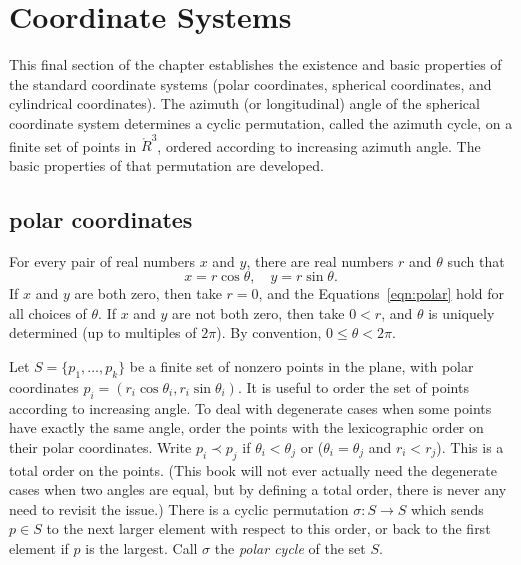 \section{Coordinate Systems}

This final section of the chapter establishes the existence
and basic properties of the standard coordinate systems
(polar coordinates, spherical coordinates, and cylindrical
coordinates).  The azimuth (or longitudinal) angle of the
spherical coordinate system determines a cyclic permutation,
called the azimuth cycle, on a finite set of points in $\ring{R}^3$, ordered according
to increasing azimuth angle.  The basic
properties of that permutation are developed. 
%
%
%
%
%
%

\subsection{polar coordinates}
\label{sec:polar}
%
%


For every pair of real numbers $x$ and $y$,  there are real numbers
$r$ and $\theta$ such that
    \begin{equation}\label{eqn:polar}
    x = r\cos\theta,\quad y = r\sin\theta.
    \end{equation}
If $x$ and $y$ are both zero, then take $r=0$, and the
Equations~\ref{eqn:polar} hold for all choices of $\theta$. If $x$
and $y$ are not both zero, then take $0<r$, and $\theta$ is
uniquely determined (up to multiples of $2\pi$).  By convention, 
$0\le\theta < 2\pi$.
%
%

Let $S=\{p_1,\ldots,p_k\}$ be a finite set of
nonzero points in the plane, with
polar coordinates $p_i = (r_i\cos\theta_i,r_i\sin\theta_i)$.
It is useful to order the set of points according to increasing angle.
To deal with degenerate cases when some points have exactly
the same angle, order the points with the lexicographic order on their
polar coordinates.  Write $p_i \prec p_j$ if
$\theta_i < \theta_j$ or ($\theta_i=\theta_j$ and $r_i<r_j$).
This is a total order on the points.  (This book will not ever
actually need the degenerate cases when two angles are equal,
but by defining a total order,  there is never any need to revisit the issue.)
%
There is a cyclic permutation $\sigma:S\to S$ which sends
$p\in S$ to the next larger element with respect to this order,
or back to the first element if $p$ is the largest.
Call $\sigma$ the {\it polar cycle}
of the set $S$.
%
%
%
%




